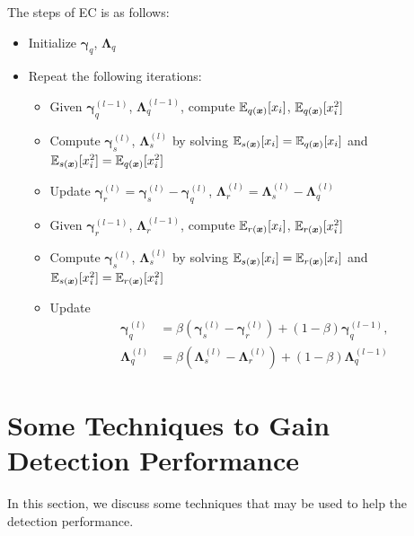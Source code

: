 \documentclass{article}
\begin{document}
The steps of EC is as follows:
\begin{itemize}
\item Initialize $\bm{\gamma}_q$, $\bm{\Lambda}_q$
\item Repeat the following iterations:
  \begin{itemize}
  \item Given $\bm{\gamma}_q^{(l-1)}$, $\bm{\Lambda}_q^{(l-1)}$, compute $\mathbb{E}_{q(\bm{x})}[x_i]$, $\mathbb{E}_{q(\bm{x})}[x_i^2]$
  \item Compute $\bm{\gamma}_s^{(l)}$, $\bm{\Lambda}_s^{(l)}$ by solving $\mathbb{E}_{s(\bm{x})}[x_i] = \mathbb{E}_{q(\bm{x})}[x_i]$ and $\mathbb{E}_{s(\bm{x})}[x_i^2] = \mathbb{E}_{q(\bm{x})}[x_i^2]$
  \item Update $\bm{\gamma}_r^{(l)} = \bm{\gamma}_s^{(l)} - \bm{\gamma}_q^{(l)}$, $\bm{\Lambda}_r^{(l)} = \bm{\Lambda}_s^{(l)} - \bm{\Lambda}_q^{(l)}$
  \item Given $\bm{\gamma}_r^{(l-1)}$, $\bm{\Lambda}_r^{(l-1)}$, compute $\mathbb{E}_{r(\bm{x})}[x_i]$, $\mathbb{E}_{r(\bm{x})}[x_i^2]$
  \item Compute $\bm{\gamma}_s^{(l)}$, $\bm{\Lambda}_s^{(l)}$ by solving $\mathbb{E}_{s(\bm{x})}[x_i] = \mathbb{E}_{r(\bm{x})}[x_i]$ and $\mathbb{E}_{s(\bm{x})}[x_i^2] = \mathbb{E}_{r(\bm{x})}[x_i^2]$
  \item Update
    \begin{align}
      \bm{\gamma}_q^{(l)} &= \beta \left( \bm{\gamma}_s^{(l)} - \bm{\gamma}_r^{(l)} \right) + (1 - \beta) \bm{\gamma}_q^{(l-1)}, \\
      \bm{\Lambda}_q^{(l)} &= \beta \left( \bm{\Lambda}_s^{(l)} - \bm{\Lambda}_r^{(l)} \right) + (1 - \beta) \bm{\Lambda}_q^{(l-1)}
    \end{align}
  \end{itemize}
\end{itemize}

\section{Some Techniques to Gain Detection Performance}
In this section, we discuss some techniques that may be used to help the detection performance.
\end{document}
